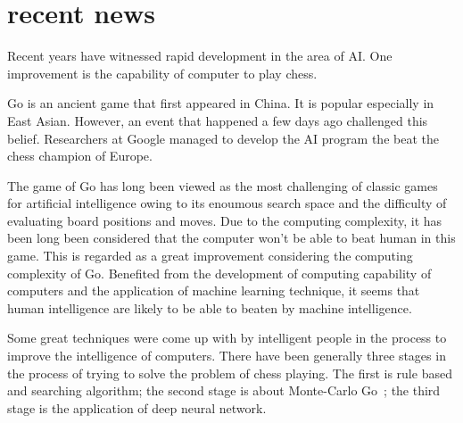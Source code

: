 \section{recent news}
Recent years have witnessed rapid development in the area of AI. One improvement is the capability of computer to play chess. 

Go is an ancient game that first appeared in China. It is popular especially in East Asian. However, an event that happened a few days ago challenged this belief. Researchers at Google managed to develop the AI program the beat the chess champion of Europe. 

The game of Go has long been viewed as the most challenging of classic games for artificial intelligence owing to its enoumous search space and the difficulty of evaluating board positions and moves. Due to the computing complexity, it has been long been considered that the computer won’t be able to beat human in this game. This is regarded as a great improvement considering the computing complexity of Go. Benefited from the development of computing capability of computers and the application of machine learning technique, it seems that human intelligence are likely to be able to beaten by machine intelligence.

Some great techniques were come up with by intelligent people in the process to improve the intelligence of computers. There have been generally three stages in the process of trying to solve the problem of chess playing. The first is rule based and searching algorithm; the second stage is about Monte-Carlo Go~\cite{brugmann1993monte, enzenberger2010fuego}; the third stage is the application of deep neural network.
